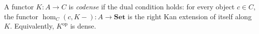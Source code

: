 A functor $K: A \to C$ is \emph{codense} if the dual condition holds: for every object $c \in C$, the functor $\hom_C(c, K-): A \to \mathbf{Set}$ is the right Kan extension of itself along $K$. Equivalently, $K^{\mathrm{op}}$ is dense.
